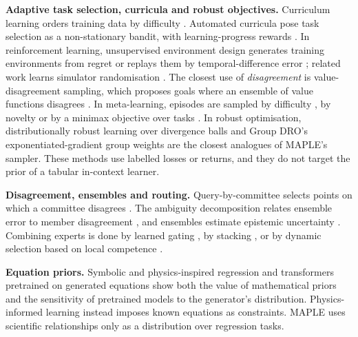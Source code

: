 \documentclass[mathematics,article,submit,pdftex,moreauthors]{Definitions/mdpi}
\begin{document}
\textbf{Adaptive task selection, curricula and robust objectives.} Curriculum learning orders training data by difficulty \cite{bengio2009curriculum}. Automated curricula pose task selection as a non-stationary bandit, with learning-progress rewards \cite{graves2017automated,matiisen2020teacher,portelas2020automatic}. In reinforcement learning, unsupervised environment design generates training environments from regret \cite{dennis2020emergent,parkerholder2022evolving} or replays them by temporal-difference error \cite{jiang2021prioritized}; related work learns simulator randomisation \cite{tobin2017domain,mehta2020active}. The closest use of \emph{disagreement} is value-disagreement sampling, which proposes goals where an ensemble of value functions disagrees \cite{zhang2020automatic}. In meta-learning, episodes are sampled by difficulty \cite{liu2020adaptive,arnold2021uniform}, by novelty \cite{kaddour2020probabilistic} or by a minimax objective over tasks \cite{collins2020task}. In robust optimisation, distributionally robust learning over divergence balls \cite{bental2013robust,namkoong2016stochastic,duchi2021learning} and Group DRO's exponentiated-gradient group weights \cite{sagawa2020distributionally} are the closest analogues of MAPLE's sampler. These methods use labelled losses or returns, and they do not target the prior of a tabular in-context learner.

\textbf{Disagreement, ensembles and routing.} Query-by-committee selects points on which a committee disagrees \cite{seung1992query,burbidge2007active}. The ambiguity decomposition relates ensemble error to member disagreement \cite{krogh1995neural}, and ensembles estimate epistemic uncertainty \cite{lakshminarayanan2017simple,hullermeier2021aleatoric}. Combining experts is done by learned gating \cite{jacobs1991adaptive,jordan1994hierarchical}, by stacking \cite{wolpert1992stacked,breiman1996stacked}, or by dynamic selection based on local competence \cite{woods1997combination,ko2008from,cruz2018dynamic}.

\textbf{Equation priors.} Symbolic and physics-inspired regression \cite{schmidt2009distilling,udrescu2020ai,lacava2021contemporary} and transformers pretrained on generated equations \cite{lample2020deep,biggio2021neural,kamienny2022end} show both the value of mathematical priors and the sensitivity of pretrained models to the generator's distribution. Physics-informed learning \cite{raissi2019physics,karniadakis2021physics} instead imposes known equations as constraints. MAPLE uses scientific relationships only as a distribution over regression tasks.
\end{document}
